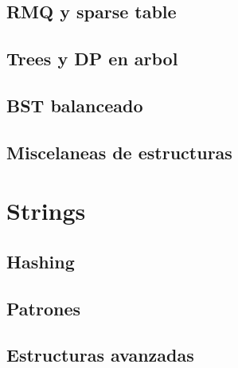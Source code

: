 \documentclass{article}
\begin{document}
	\subsection{RMQ y sparse table}
	
	

	\subsection{Trees y DP en arbol}
	
	
	
	

	\subsection{BST balanceado}
	

	\subsection{Miscelaneas de estructuras}
	
	

	\section{Strings}
	\subsection{Hashing}
	

	\subsection{Patrones}
	
	
	
	
	

	\subsection{Estructuras avanzadas}
	
	
	
	
\end{document}
